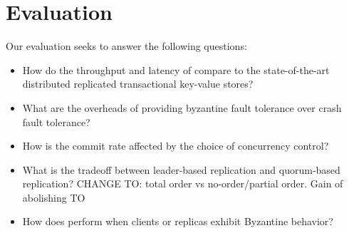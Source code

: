 
\section{Evaluation}
\label{section:eval}

Our evaluation seeks to answer the following questions:
\begin{itemize}
  \item How do the throughput and latency of \sys{} compare to the
    state-of-the-art distributed replicated transactional key-value
    stores?
  \item What are the overheads of providing byzantine fault tolerance over
    crash fault tolerance?
  \item How is the commit rate affected by the choice of concurrency control?
  \item What is the tradeoff between leader-based replication and quorum-based
    replication? CHANGE TO: total order vs no-order/partial order. Gain of abolishing TO
  \item How does \sys{} perform when clients or replicas exhibit Byzantine
    behavior?
\end{itemize}

